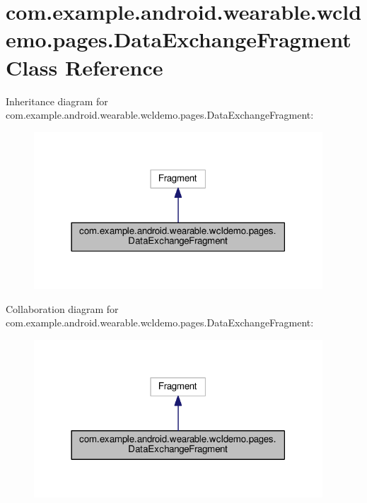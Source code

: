 \hypertarget{classcom_1_1example_1_1android_1_1wearable_1_1wcldemo_1_1pages_1_1DataExchangeFragment}{}\section{com.\+example.\+android.\+wearable.\+wcldemo.\+pages.\+Data\+Exchange\+Fragment Class Reference}
\label{classcom_1_1example_1_1android_1_1wearable_1_1wcldemo_1_1pages_1_1DataExchangeFragment}


Inheritance diagram for com.\+example.\+android.\+wearable.\+wcldemo.\+pages.\+Data\+Exchange\+Fragment\+:
\nopagebreak
\begin{figure}[H]
\begin{center}
\leavevmode
\includegraphics[width=306pt]{db/d7c/classcom_1_1example_1_1android_1_1wearable_1_1wcldemo_1_1pages_1_1DataExchangeFragment__inherit__graph}
\end{center}
\end{figure}


Collaboration diagram for com.\+example.\+android.\+wearable.\+wcldemo.\+pages.\+Data\+Exchange\+Fragment\+:
\nopagebreak
\begin{figure}[H]
\begin{center}
\leavevmode
\includegraphics[width=306pt]{d4/d0f/classcom_1_1example_1_1android_1_1wearable_1_1wcldemo_1_1pages_1_1DataExchangeFragment__coll__graph}
\end{center}
\end{figure}
